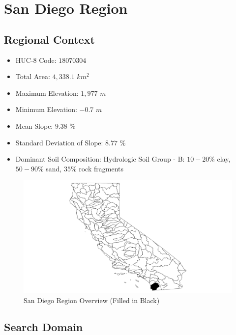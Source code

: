 \section{San Diego Region}

    \subsection{Regional Context}
    
    \begin{itemize}
      \setlength{\itemsep}{0cm}
      \setlength{\parskip}{0cm}
        \item HUC-8 Code: $18070304$
        \item Total Area: $4,338.1$ $km^2$
        \item Maximum Elevation: $1,977$ $m$
        \item Minimum Elevation: $-0.7$ $m$
        \item Mean Slope: $9.38$ $\%$
        \item Standard Deviation of Slope: $8.77$ $\%$
        \item Dominant Soil Composition: Hydrologic Soil Group - B: $10-20\%$ clay, $50-90\%$ sand, $35\%$ rock fragments
    \end{itemize}
    
        \begin{figure}[!h]
            \begin{center}
            \includegraphics[width=5.5in]{figures/SanDiego_Overview.png}   
            \caption{San Diego Region Overview (Filled in Black)}
            \label{fig:SDoverview}
            \end{center}
        \end{figure}

    \subsection{Search Domain}
    
